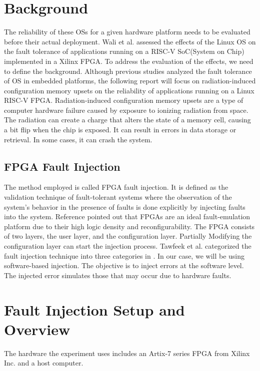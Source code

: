 \documentclass[conference]{IEEEtran}
\begin{document}
\section{Background}
The reliability of these OSs for a given hardware platform needs to be evaluated before their actual deployment.
Wali et al. \cite{b2} assessed the effects of the Linux OS on the fault tolerance of applications running on a RISC-V 
SoC(System on Chip) implemented in a Xilinx FPGA. To address the evaluation of the effects, we need to define the 
background. Although previous studies analyzed the fault tolerance of OS in embedded platforms, the following 
report will focus on radiation-induced configuration memory upsets on the reliability of applications running on 
a Linux RISC-V FPGA. Radiation-induced configuration memory upsets are a type of computer hardware failure caused 
by exposure to ionizing radiation from space. The radiation can create a charge that alters the state of a memory 
cell, causing a bit flip when the chip is exposed. It can result in errors in data storage or retrieval. In some
cases, it can crash the system. 
\subsection{FPGA Fault Injection} %
The method employed is called FPGA fault injection. It is defined as the validation technique of fault-tolerant 
systems where the observation of the system's behavior in the presence of faults is done explicitly by 
injecting faults into the system. Reference \cite{b2} pointed out that FPGAs are an ideal fault-emulation platform 
due to their high logic density and reconfigurability. The FPGA consists of two layers, the user layer, and the configuration 
layer. Partially Modifying the configuration layer can start the injection process. Tawfeek et al. categorized the fault 
injection technique into three categories in \cite{b4}. In our case, we will be using software-based injection. 
The objective is to inject errors at the software level. The injected error simulates those that may occur due to hardware faults. 

\section{Fault Injection Setup and Overview}
The hardware the experiment uses includes an Artix-7 series FPGA from Xilinx Inc. and a host computer. 
\end{document}
